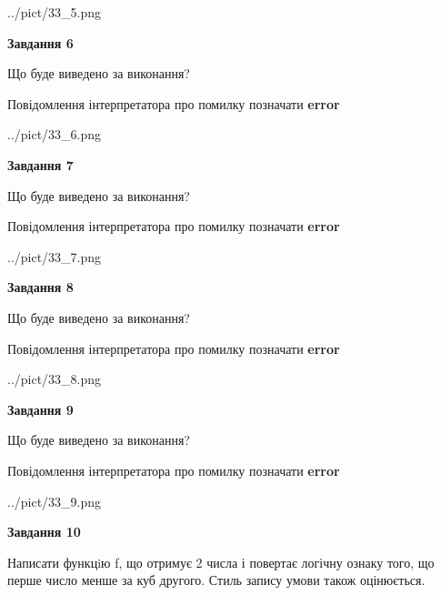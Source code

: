 \documentclass[12pt, ukrainian]{article}
\begin{document}
{\begin {large}
\begin{center}
	{../pict/33_5.png}
\end{center}
\newpage

{\begin {center}\textbf{Завдання 6}\end {center}}\par
Що буде виведено за виконання? \par
Повідомлення інтерпретатора про помилку позначати \textbf{error}

\begin{center}
	{../pict/33_6.png}
\end{center}
\newpage

{\begin {center}\textbf{Завдання 7}\end {center}}\par
Що буде виведено за виконання? \par
Повідомлення інтерпретатора про помилку позначати \textbf{error}

\begin{center}
	{../pict/33_7.png}
\end{center}
\newpage

{\begin {center}\textbf{Завдання 8}\end {center}}\par
Що буде виведено за виконання? \par
Повідомлення інтерпретатора про помилку позначати \textbf{error}

\begin{center}
	{../pict/33_8.png}
\end{center}
\newpage

{\begin {center}\textbf{Завдання 9}\end {center}}\par
Що буде виведено за виконання? \par
Повідомлення інтерпретатора про помилку позначати \textbf{error}

\begin{center}
	{../pict/33_9.png}
\end{center}
\newpage

{\begin {center}\textbf{Завдання 10}\end {center}}\par

Написати функцiю f, що отримує 2 числа і повертає логічну ознаку того, що перше число менше за куб другого. Стиль запису умови також оцінюється.\par
\newpage

\end {large}}
\end{document}
